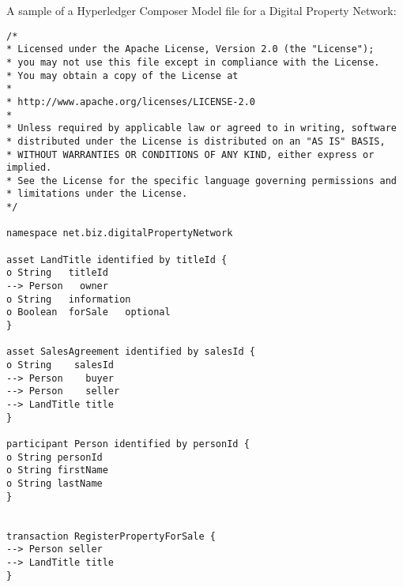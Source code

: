 A sample of a Hyperledger Composer Model file for a Digital Property Network:
\begin{verbatim}
/*
* Licensed under the Apache License, Version 2.0 (the "License");
* you may not use this file except in compliance with the License.
* You may obtain a copy of the License at
*
* http://www.apache.org/licenses/LICENSE-2.0
*
* Unless required by applicable law or agreed to in writing, software
* distributed under the License is distributed on an "AS IS" BASIS,
* WITHOUT WARRANTIES OR CONDITIONS OF ANY KIND, either express or implied.
* See the License for the specific language governing permissions and
* limitations under the License.
*/

namespace net.biz.digitalPropertyNetwork

asset LandTitle identified by titleId {
o String   titleId
--> Person   owner
o String   information
o Boolean  forSale   optional
}

asset SalesAgreement identified by salesId {
o String    salesId
--> Person    buyer
--> Person    seller
--> LandTitle title
}

participant Person identified by personId {
o String personId
o String firstName
o String lastName
}


transaction RegisterPropertyForSale {
--> Person seller
--> LandTitle title
}

\end{verbatim}
